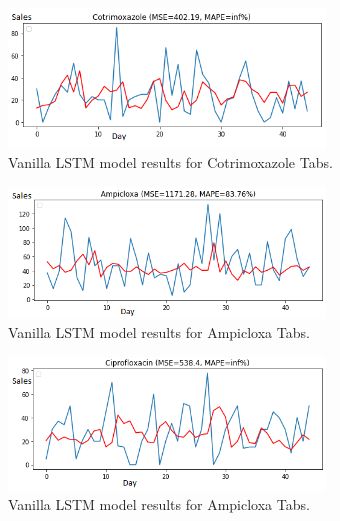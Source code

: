 \documentclass[12pt]{report}
\begin{document}
  \begin{figure}[H]%
    \begin {center}
    \includegraphics[width=0.75\textwidth]{images/vanilla1 (2)C.png}
    \caption{Vanilla LSTM model results for Cotrimoxazole Tabs.}
    \label{fig:ecg}
    \end {center}
  \end{figure}

  \begin{figure}[H]%
    \begin {center}
    \includegraphics[width=0.75\textwidth]{images/vanilla1 (4)A.png}
    \caption{Vanilla LSTM model results for Ampicloxa Tabs.}
    \label{fig:ecg}
    \end {center}
  \end{figure}

  \begin{figure}[H]%
    \begin {center}
    \includegraphics[width=0.75\textwidth]{images/vanilla1 (4)B.png}
    \caption{Vanilla LSTM model results for Ampicloxa Tabs.}
    \label{fig:ecg}
    \end {center}
  \end{figure}
 
\end{document}
